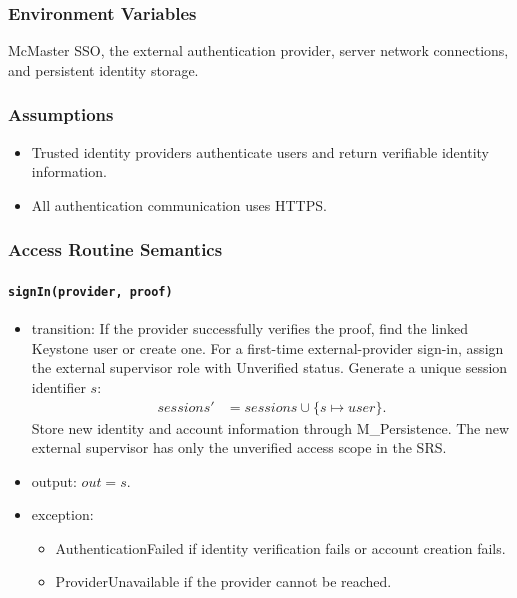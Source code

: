\documentclass[12pt, titlepage]{article}
\begin{document}
\subsubsection{Environment Variables}

McMaster SSO, the external authentication provider, server network connections, and persistent identity storage.

\subsubsection{Assumptions}

\begin{itemize}
    \item Trusted identity providers authenticate users and return verifiable identity information.
    \item All authentication communication uses HTTPS.
\end{itemize}

\subsubsection{Access Routine Semantics}

\paragraph{\texttt{signIn(provider, proof)}}
\begin{itemize}
    \item transition: If the provider successfully verifies the proof, find the linked Keystone user or create one. For a first-time external-provider sign-in, assign the external supervisor role with Unverified status. Generate a unique session identifier $s$:
    \[
    \begin{aligned}
        \mathit{sessions}' &=
        \mathit{sessions}\cup\{s\mapsto user\}.
    \end{aligned}
    \]
    Store new identity and account information through M\_Persistence. The new external supervisor has only the unverified access scope in the SRS.

    \item output: $out=s$.

    \item exception:
    \begin{itemize}
        \item AuthenticationFailed if identity verification fails or account creation fails.
        \item ProviderUnavailable if the provider cannot be reached.
    \end{itemize}
\end{itemize}
\end{document}
